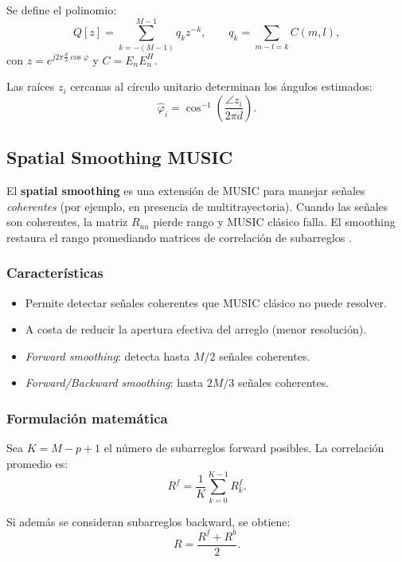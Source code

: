 Se define el polinomio:
\begin{equation}
	Q[z] = \sum_{k=-(M-1)}^{M-1} q_k z^{-k}, 
	\qquad q_k = \sum_{m-l=k} C(m,l),
\end{equation}
con $z = e^{j 2\pi \tfrac{d}{\lambda} \cos\varphi}$ y $C = E_n E_n^H$.  

Las raíces $z_i$ cercanas al círculo unitario determinan los ángulos estimados:
\begin{equation}
	\hat{\varphi}_i = \cos^{-1}\!\left(\frac{\angle z_i}{2\pi d}\right).
\end{equation}

\subsection{Spatial Smoothing MUSIC}\label{sec:doa:ssmusic}

El \textbf{spatial smoothing} es una extensión de MUSIC para manejar señales \emph{coherentes} (por ejemplo, en presencia de multitrayectoria).  
Cuando las señales son coherentes, la matriz $R_{uu}$ pierde rango y MUSIC clásico falla.  
El smoothing restaura el rango promediando matrices de correlación de subarreglos \cite{Gupta2015}.  

\subsubsection*{Características}
\begin{itemize}
	\item Permite detectar señales coherentes que MUSIC clásico no puede resolver.  
	\item A costa de reducir la apertura efectiva del arreglo (menor resolución).  
	\item \emph{Forward smoothing}: detecta hasta $M/2$ señales coherentes.  
	\item \emph{Forward/Backward smoothing}: hasta $2M/3$ señales coherentes.  
\end{itemize}

\subsubsection*{Formulación matemática}

Sea $K=M-p+1$ el número de subarreglos forward posibles.  
La correlación promedio es:
\begin{equation}
	R^f = \frac{1}{K}\sum_{k=0}^{K-1} R^f_k.
\end{equation}

Si además se consideran subarreglos backward, se obtiene:
\begin{equation}
	R = \frac{R^f + R^b}{2}.
\end{equation}

